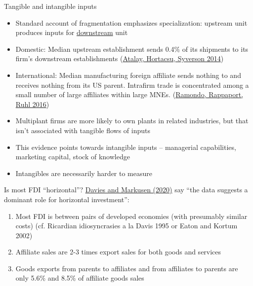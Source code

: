 \documentclass[11pt,notes=hide,aspectratio=169]{beamer}
\begin{document}
\begin{frame}{Tangible and intangible inputs}
\begin{itemize}
\item Standard account of fragmentation emphasizes specialization: upstream unit produces inputs for \href{http://markets.ft.com/research/Lexicon/Term?term=downstream}{downstream} unit
\item {Domestic: Median upstream establishment sends 0.4\% of its shipments to its firm's downstream establishments {\small (\href{http://pubs.aeaweb.org.proxy.uchicago.edu/doi/pdfplus/10.1257/aer.104.4.1120}{Atalay, Hortacsu, Syverson 2014})}\par}
\item {International: Median manufacturing foreign affiliate sends nothing to and receives nothing from its US parent. Intrafirm trade is concentrated among a small number of large affiliates within large MNEs. {\small (\href{http://voxeu.org/article/international-production-networks-and-intra-firm-trade-new-evidence}{Ramondo, Rappaport, Ruhl 2016})}\par}
\item Multiplant firms are more likely to own plants in related industries, but that isn't associated with tangible flows of inputs
\item This evidence points towards intangible inputs -- managerial capabilities, marketing capital, stock of knowledge
\item Intangibles are necessarily harder to measure
\end{itemize}
\end{frame}
\begin{frame}{Is most FDI ``horizontal''?}
\href{https://www.econstor.eu/bitstream/10419/216546/1/cesifo1_wp8150.pdf}{Davies and Markusen (2020)} say ``the data suggests a dominant role for horizontal investment'':
\begin{enumerate}
\item 
Most FDI is between pairs of developed economies (with presumably similar costs)
(cf. Ricardian idiosyncrasies a la Davis 1995 or Eaton and Kortum 2002)
\item 
Affiliate sales are 2-3 times export sales for both goods and services
\item 
Goods exports from parents to affiliates and from affiliates to parents are only 5.6\% and 8.5\% of affiliate goods sales
\end{enumerate}
\end{frame}
\end{document}
